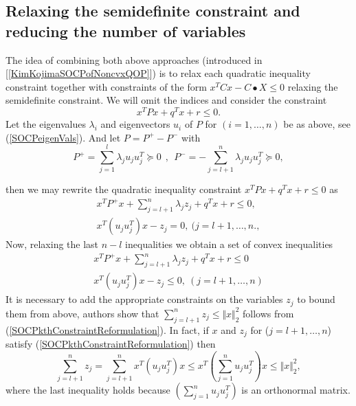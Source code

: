\documentclass[12pt]{book}
\theoremstyle{definition}
\begin{document}


\subsection{Relaxing the semidefinite constraint and reducing the number of variables}
\label{SubsectionSOCPrelaxInOriginalVariable}

The idea of combining both above approaches (introduced in [\ref{KimKojimaSOCPofNoncvxQOP}]) is to relax each 
quadratic inequality constraint together with constraints of the form $x^TCx-C\bullet X \leq 0$ relaxing the semidefinite constraint. We will omit the indices and consider the constraint
\begin{equation}
\label{SOCPsingleQconst}
x^TPx + q^Tx + r\leq 0.
\end{equation}
Let the eigenvalues $\lambda_i$ and eigenvectors $u_i$ of $P$ for $(i = 1,\dots ,n)$ be as above, see (\ref{SOCPeigenVals}). And let $ P = P^+ - P^-$ with 
\begin{equation}
P^+ = \sum_{j = 1}^{l}\lambda_j u_ju_j^T\succeq 0 \ \ , \ \ P^-  = -\sum_{j = l+1}^{n}\lambda_j u_ju_j^T\succeq 0,
\end{equation}

then we may rewrite the quadratic inequality constraint $x^TPx + q^Tx + r \leq 0$ as 
\begin{equation}
\begin{array}{l}
\label{SOCPkthConstraintReformulation}
x^TP^+x + \sum_{j = l + 1}^n \lambda_j z_j + q^Tx + r \leq 0, \\
x^T(u_ju_j^T)x - z_j = 0, \ ( j= l+1, \dots ,n., 
\end{array}
\end{equation}
Now, relaxing the last $n-l$ inequalities we obtain a set of convex inequalities 
\begin{equation}
\begin{array}{l}
\label{SOCPrelax2}
x^TP^+x + \sum_{j = l + 1}^n \lambda_j z_j + q^Tx + r \leq 0 \\
x^T(u_ju_j^T)x - z_j \leq 0, \ ( j= l+1, \dots ,n) 
\end{array}
\end{equation}
It is necessary to add the appropriate constraints on the variables $z_j$ to bound them from above, authors 
show that $\sum_{j=l+1}^n z_j \leq \Vert x\Vert_2^2$ follows from (\ref{SOCPkthConstraintReformulation}). 
In fact, if $x$ and $z_j$ for ($j = l+1,\dots ,n$) satisfy (\ref{SOCPkthConstraintReformulation})
then 
\begin{equation}
\sum_{j=l+1}^n z_j = \sum_{j=l+1}^nx^T(u_ju_j^T)x \leq  x^T \left(\sum_{j=1}^nu_ju_j^T\right)x \leq \Vert x\Vert_2^2,
\end{equation}
where the last inequality holds because $\left(\sum_{j=1}^nu_ju_j^T\right)$ is an orthonormal matrix.
\end{document}
